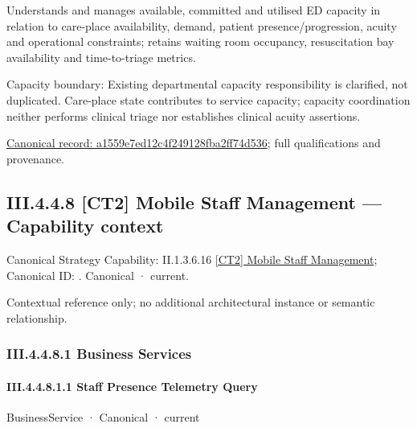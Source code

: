 Understands and manages available, committed and utilised ED capacity in relation to care-place availability, demand, patient presence/progression, acuity and operational constraints; retains waiting room occupancy, resuscitation bay availability and time-to-triage metrics.



Capacity boundary: Existing departmental capacity responsibility is clarified, not duplicated. Care-place state contributes to service capacity; capacity coordination neither performs clinical triage nor establishes clinical acuity assertions.


{\footnotesize \href{../../../../../../../continuum/business/business-function/a1559e7ed12c4f249128fba2ff74d536.md}{Canonical record: a1559e7ed12c4f249128fba2ff74d536}; full qualifications and provenance.}\par
\subsection*{III.4.4.8 [CT2] Mobile Staff Management — Capability context}
\label{navigation:III.4.4.8}

{\small Canonical Strategy Capability: II.1.3.6.16 \hyperref[element:79a4a48fddf74c69acf7e16404d06ea5]{[CT2] Mobile Staff Management}; Canonical ID: \texttt{}. Canonical · current.}\par
Contextual reference only; no additional architectural instance or semantic relationship.\par
\subsubsection*{III.4.4.8.1 Business Services}
\label{navigation:III.4.4.8.1}

\paragraph*{III.4.4.8.1.1 Staff Presence Telemetry Query}
\label{navigation:III.4.4.8.1.1}

\label{element:b3cd0d8e40f44b9fa2b64367237345fa}
{\small BusinessService · Canonical · current}\par


